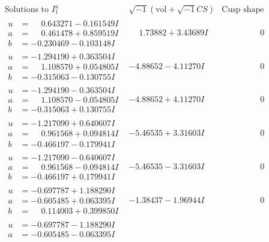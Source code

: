 \documentclass[1p]{elsarticle_modified}
\theoremstyle{definition}
\newcommand{\I}{\sqrt{-1}}
\begin{document}
$$\begin{array}{c|c|c}
\text{Solutions to }I^u_{1}& \I (\text{vol} + \sqrt{-1}CS) & \text{Cusp shape}\\
 \hline 
\begin{aligned}
u &= \phantom{-}0.643271 - 0.161549 I \\
a &= \phantom{-}0.461478 + 0.859519 I \\
b &= -0.230469 - 0.103148 I\end{aligned}
 & \phantom{-}1.73882 + 3.43689 I & \phantom{-0.000000 } 0 \\ \hline\begin{aligned}
u &= -1.294190 + 0.363504 I \\
a &= \phantom{-}1.108570 + 0.054805 I \\
b &= -0.315063 - 0.130755 I\end{aligned}
 & -4.88652 - 4.11270 I & \phantom{-0.000000 } 0 \\ \hline\begin{aligned}
u &= -1.294190 - 0.363504 I \\
a &= \phantom{-}1.108570 - 0.054805 I \\
b &= -0.315063 + 0.130755 I\end{aligned}
 & -4.88652 + 4.11270 I & \phantom{-0.000000 } 0 \\ \hline\begin{aligned}
u &= -1.217090 + 0.640607 I \\
a &= \phantom{-}0.961568 + 0.094814 I \\
b &= -0.466197 - 0.179941 I\end{aligned}
 & -5.46535 + 3.31603 I & \phantom{-0.000000 } 0 \\ \hline\begin{aligned}
u &= -1.217090 - 0.640607 I \\
a &= \phantom{-}0.961568 - 0.094814 I \\
b &= -0.466197 + 0.179941 I\end{aligned}
 & -5.46535 - 3.31603 I & \phantom{-0.000000 } 0 \\ \hline\begin{aligned}
u &= -0.697787 + 1.188290 I \\
a &= -0.605485 + 0.063395 I \\
b &= \phantom{-}0.114003 + 0.399850 I\end{aligned}
 & -1.38437 - 1.96944 I & \phantom{-0.000000 } 0 \\ \hline\begin{aligned}
u &= -0.697787 - 1.188290 I \\
a &= -0.605485 - 0.063395 I \\

\end{aligned}
\end{array}$$
\end{document}
